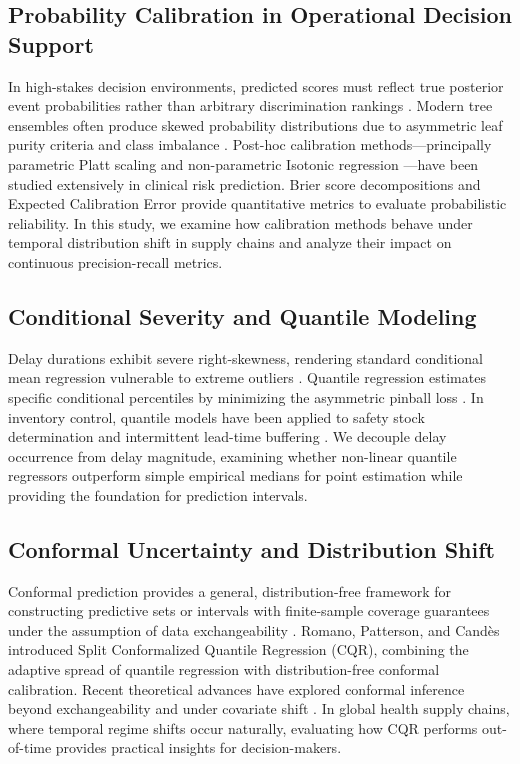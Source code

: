\documentclass[11pt,a4paper]{article}
\begin{document}
\subsection{Probability Calibration in Operational Decision Support}
In high-stakes decision environments, predicted scores must reflect true posterior event probabilities rather than arbitrary discrimination rankings \cite{platt1999probabilistic, niculescu2005predicting, zadrozny2002transforming}. Modern tree ensembles often produce skewed probability distributions due to asymmetric leaf purity criteria and class imbalance \cite{guo2017calibration}. Post-hoc calibration methods---principally parametric Platt scaling \cite{platt1999probabilistic} and non-parametric Isotonic regression \cite{zadrozny2002transforming}---have been studied extensively in clinical risk prediction. Brier score decompositions \cite{brier1950verification} and Expected Calibration Error \cite{guo2017calibration} provide quantitative metrics to evaluate probabilistic reliability. In this study, we examine how calibration methods behave under temporal distribution shift in supply chains and analyze their impact on continuous precision-recall metrics.

\subsection{Conditional Severity and Quantile Modeling}
Delay durations exhibit severe right-skewness, rendering standard conditional mean regression vulnerable to extreme outliers \cite{koenker1978regression}. Quantile regression estimates specific conditional percentiles by minimizing the asymmetric pinball loss \cite{koenker1978regression, meinshausen2006quantile}. In inventory control, quantile models have been applied to safety stock determination and intermittent lead-time buffering \cite{kurentzes2020optimising, simchilevi2014superstorms}. We decouple delay occurrence from delay magnitude, examining whether non-linear quantile regressors outperform simple empirical medians for point estimation while providing the foundation for prediction intervals.

\subsection{Conformal Uncertainty and Distribution Shift}
Conformal prediction provides a general, distribution-free framework for constructing predictive sets or intervals with finite-sample coverage guarantees under the assumption of data exchangeability \cite{vovk2005algorithmic, angelopoulos2023gentle}. Romano, Patterson, and Candès \cite{romano2019cqr} introduced Split Conformalized Quantile Regression (CQR), combining the adaptive spread of quantile regression with distribution-free conformal calibration. Recent theoretical advances have explored conformal inference beyond exchangeability and under covariate shift \cite{tibshirani2019covariate, barber2023beyond, gibbs2021adaptive}. In global health supply chains, where temporal regime shifts occur naturally, evaluating how CQR performs out-of-time provides practical insights for decision-makers.
\end{document}
